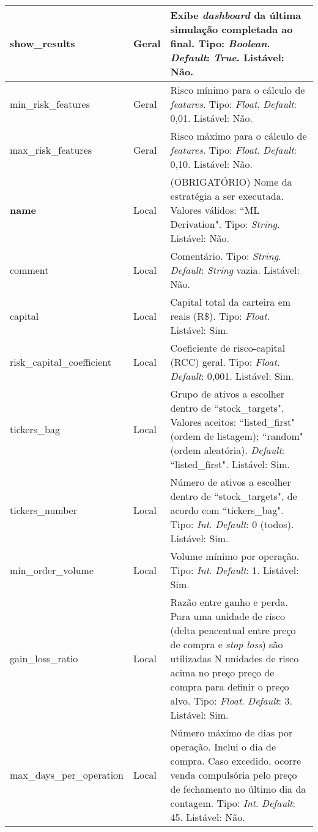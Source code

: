 \begin{center}
{\begin{longtable}[m]{| m{11em} | m{3em}| m{21em} |}
        \hline
        show\_results & Geral & Exibe \textit{dashboard} da última simulação completada ao final. Tipo: \textit{Boolean}. \textit{Default}: \textit{True}. Listável: Não. \\
        \hline
        min\_risk\_features & Geral & Risco mínimo para o cálculo de \textit{features}. Tipo: \textit{Float}. \textit{Default}: 0,01. Listável: Não. \\
        \hline
        max\_risk\_features & Geral & Risco máximo para o cálculo de \textit{features}. Tipo: \textit{Float}. \textit{Default}: 0,10. Listável: Não. \\
        \hline
        \textbf{name} & Local & (OBRIGATÓRIO) Nome da estratégia a ser executada. Valores válidos: ``ML Derivation". Tipo: \textit{String}. Listável: Não. \\
        \hline
        comment & Local & Comentário. Tipo: \textit{String}. \textit{Default}: \textit{String} vazia. Listável: Não. \\
        \hline
        capital & Local & Capital total da carteira em reais (R\$). Tipo: \textit{Float}. Listável: Sim. \\
        \hline
        risk\_capital\_coefficient & Local & Coeficiente de risco-capital (RCC) geral. Tipo: \textit{Float}. \textit{Default}: 0,001. Listável: Sim. \\
        \hline
        tickers\_bag & Local & Grupo de ativos a escolher dentro de ``stock\_targets". Valores aceitos: ``listed\_first" (ordem de listagem); ``random" (ordem aleatória). \textit{Default}: ``listed\_first". Listável: Sim. \\
        \hline
        tickers\_number & Local & Número de ativos a escolher dentro de ``stock\_targets", de acordo com ``tickers\_bag". Tipo: \textit{Int}. \textit{Default}: 0 (todos). Listável: Sim. \\
        \hline
        min\_order\_volume & Local & Volume mínimo por operação. Tipo: \textit{Int}. \textit{Default}: 1. Listável: Sim. \\
        \hline
        gain\_loss\_ratio & Local & Razão entre ganho e perda. Para uma unidade de risco (delta pencentual entre preço de compra e \textit{stop loss}) são utilizadas N unidades de risco acima no preço preço de compra para definir o preço alvo. Tipo: \textit{Float}. \textit{Default}: 3. Listável: Sim. \\
        \hline
        max\_days\_per\_operation & Local & Número máximo de dias por operação. Inclui o dia de compra. Caso excedido, ocorre venda compulsória pelo preço de fechamento no último dia da contagem. Tipo: \textit{Int}. \textit{Default}: 45. Listável: Não. \\

\end{longtable}}
\end{center}
